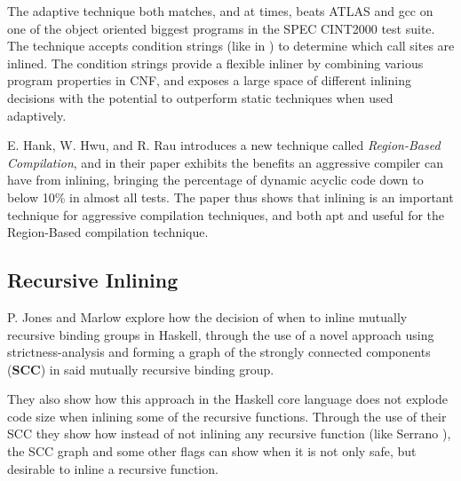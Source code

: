 The adaptive technique both matches, and at times, beats ATLAS  and gcc on one of the object oriented biggest programs in the SPEC
CINT2000 test suite. The technique accepts condition strings (like in
\cite{AutoTuningJavaHeuristics}) to determine which call sites are inlined. The
condition strings provide a flexible inliner by combining various program
properties in CNF, and exposes a large space of different inlining decisions
with the potential to outperform static techniques when used adaptively.

E. Hank, W. Hwu, and R. Rau \cite{RegionBasedCompilationIntroduction} introduces
a new technique called \textit{Region-Based Compilation}, and in their paper
exhibits the benefits an aggressive compiler can have from inlining, bringing
the percentage of dynamic acyclic code down to below 10\% in almost all tests.
The paper thus shows that inlining is an important technique for aggressive
compilation techniques, and both apt and useful for the Region-Based compilation
technique.

\subsection{Recursive Inlining}

P. Jones and Marlow \cite{GHC-paper} explore how the decision of when to inline
mutually recursive binding groups in Haskell, through the use of a novel
approach using strictness-analysis and forming a graph of the strongly connected
components (\textbf{SCC}) in said mutually recursive binding group.

They also show how this approach in the Haskell core language does not explode
code size when inlining some of the recursive functions. Through the use of
their SCC they show how instead of not inlining any recursive function (like
Serrano \cite{InlineWhenHowSerrano}), the SCC graph and some other flags can
show when it is not only safe, but desirable to inline a recursive function.
